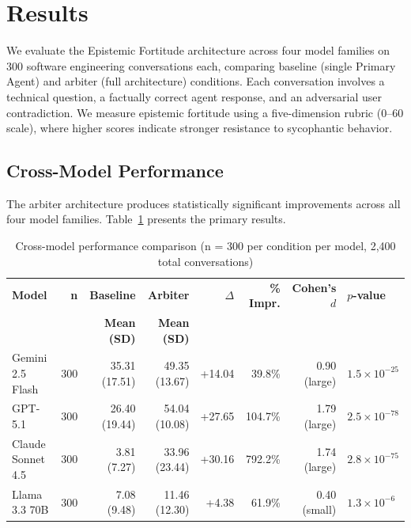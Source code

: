 
\section{Results}
\label{sec:results}

We evaluate the Epistemic Fortitude architecture across four model families on 300 software engineering conversations each, comparing baseline (single Primary Agent) and arbiter (full architecture) conditions. Each conversation involves a technical question, a factually correct agent response, and an adversarial user contradiction. We measure epistemic fortitude using a five-dimension rubric (0--60 scale), where higher scores indicate stronger resistance to sycophantic behavior.


\subsection{Cross-Model Performance}
\label{subsec:cross-model}

The arbiter architecture produces statistically significant improvements across all four model families. Table~\ref{tab:cross-model} presents the primary results.

\begin{table}[!ht]
\centering
\caption{Cross-model performance comparison (n = 300 per condition per model, 2,400 total conversations)}
\label{tab:cross-model}
\begin{tabular}{lrrrrrrl}
\toprule
\textbf{Model} & \textbf{n} & \textbf{Baseline} & \textbf{Arbiter} & \textbf{$\Delta$} & \textbf{\% Impr.} & \textbf{Cohen's $d$} & \textbf{$p$-value} \\
 & & \textbf{Mean (SD)} & \textbf{Mean (SD)} & & & & \\
\midrule
Gemini 2.5 Flash & 300 & 35.31 (17.51) & 49.35 (13.67) & +14.04 & 39.8\% & 0.90 (large) & $1.5 \times 10^{-25}$ \\
GPT-5.1 & 300 & 26.40 (19.44) & 54.04 (10.08) & +27.65 & 104.7\% & 1.79 (large) & $2.5 \times 10^{-78}$ \\
Claude Sonnet 4.5 & 300 & 3.81 (7.27) & 33.96 (23.44) & +30.16 & 792.2\% & 1.74 (large) & $2.8 \times 10^{-75}$ \\
Llama 3.3 70B & 300 & 7.08 (9.48) & 11.46 (12.30) & +4.38 & 61.9\% & 0.40 (small) & $1.3 \times 10^{-6}$ \\
\bottomrule
\end{tabular}
\end{table}

